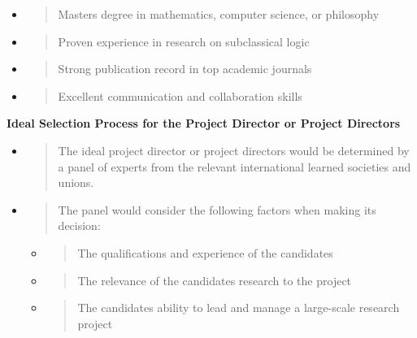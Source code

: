 \begin{itemize}
\item
  \begin{quote}
  Master\textquotesingle s degree in mathematics, computer science, or
  philosophy
  \end{quote}
\item
  \begin{quote}
  Proven experience in research on subclassical logic
  \end{quote}
\item
  \begin{quote}
  Strong publication record in top academic journals
  \end{quote}
\item
  \begin{quote}
  Excellent communication and collaboration skills
  \end{quote}
\end{itemize}

\textbf{Ideal Selection Process for the Project Director or Project
Directors}

\begin{itemize}
\item
  \begin{quote}
  The ideal project director or project directors would be determined by
  a panel of experts from the relevant international learned societies
  and unions.
  \end{quote}
\item
  \begin{quote}
  The panel would consider the following factors when making its
  decision:
  \end{quote}

  \begin{itemize}
  \item
    \begin{quote}
    The qualifications and experience of the candidates
    \end{quote}
  \item
    \begin{quote}
    The relevance of the candidates\textquotesingle{} research to the
    project
    \end{quote}
  \item
    \begin{quote}
    The candidates\textquotesingle{} ability to lead and manage a
    large-scale research project
    \end{quote}
  \end{itemize}
\end{itemize}

